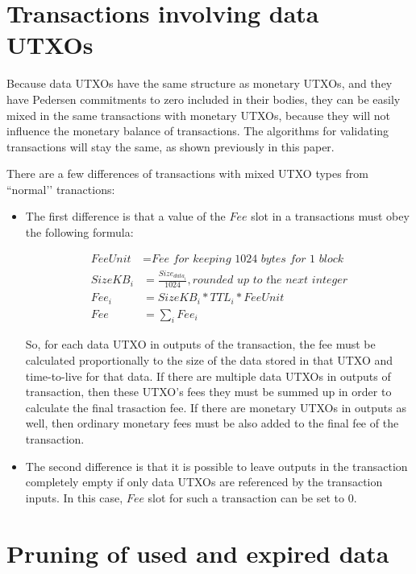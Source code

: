 \documentclass[8pt,fleqn,openany]{book}
\begin{document}
\section{Transactions involving data UTXOs}

Because data UTXOs have the same structure as monetary UTXOs, and they have Pedersen commitments to zero included in their bodies, they can be easily mixed in the same transactions with monetary UTXOs, because they will not influence the monetary balance of transactions. The algorithms for validating transactions will stay the same, as shown previously in this paper.

There are a few differences of transactions with mixed UTXO types from ``normal’’ tranactions:

\begin{itemize}

  \item{The first difference is that a value of the $Fee$ slot in a transactions must obey the following formula:

  \begin{align*}
    FeeUnit &= \textit{Fee for keeping 1024 bytes for 1 block} \\
    SizeKB_i &= \frac{Size_{data_i}}{1024}, \textit{rounded up to the next integer}\\
    Fee_i &= SizeKB_i * TTL_i * FeeUnit\\
    Fee &= \sum_i Fee_i
  \end{align*}

  So, for each data UTXO in outputs of the transaction, the fee must be calculated proportionally to the size of the data stored in that UTXO and time-to-live for that data. If there are multiple data UTXOs in outputs of transaction, then these UTXO’s fees they must be summed up in order to calculate the final trasaction fee. If there are monetary UTXOs in outputs as well, then ordinary monetary fees must be also added to the final fee of the transaction.}

  \item{The second difference is that it is possible to leave outputs in the transaction completely empty if only data UTXOs are referenced by the transaction inputs. In this case, $Fee$ slot for such a transaction can be set to $0$.}
\end{itemize}

\section{Pruning of used and expired data}\label{app:pruning}
\end{document}
